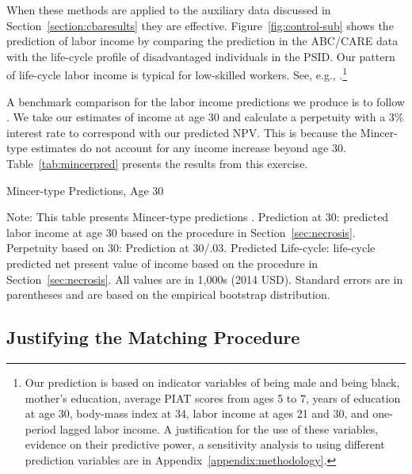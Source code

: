 When these methods are applied to the auxiliary data discussed in Section~\ref{section:cbaresults} they are effective. Figure~\ref{fig:control-sub} shows the prediction of labor income by comparing the prediction in the ABC/CARE data with the life-cycle profile of disadvantaged individuals in the PSID. Our pattern of life-cycle labor income is typical for low-skilled workers. See, e.g., \cite{Blundell-etal_2015_J-Pub-E}.\footnote{Our prediction is based on indicator variables of being male and being black, mother's education, average PIAT scores from ages 5 to 7, years of education at age 30, body-mass index at 34, labor income at ages 21 and 30, and one-period lagged labor income. A justification for the use of these variables, evidence on their predictive power, a sensitivity analysis to using different prediction variables are in Appendix~\ref{appendix:methodology}.}

A benchmark comparison for the labor income predictions we produce is to follow \citet{Mincer_1974_schooling}. We take our estimates of income at age 30 and calculate a perpetuity with a 3\% interest rate to correspond with our predicted NPV. This is because the Mincer-type estimates do not account for any income increase beyond age 30. Table~\ref{tab:mincerpred} presents the results from this exercise.

\begin{table}[htbp]
\centering
\begin{threeparttable}
\caption{Mincer-type Predictions, Age 30}\label{tab:mincerpred}
\small

\begin{tablenotes}
\footnotesize
\item Note: This table presents Mincer-type predictions \citep{Mincer_1974_schooling}. Prediction at 30: predicted labor income at age 30 based on the procedure in Section~\ref{sec:necrosis}. Perpetuity based on 30: Prediction at 30/.03. Predicted Life-cycle: life-cycle predicted net present value of income based on the procedure in Section~\ref{sec:necrosis}. All values are in 1,000s (2014 USD). Standard errors are in parentheses and are based on the empirical bootstrap distribution.
\end{tablenotes}
\end{threeparttable}
\end{table}

\subsection{Justifying the Matching Procedure} \label{section:just}

